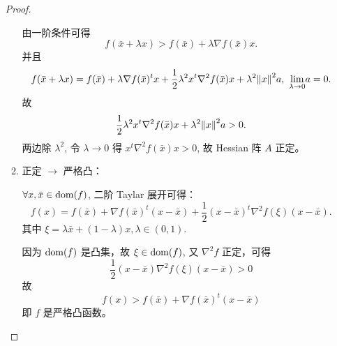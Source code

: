 \begin{Problem}
\begin{enumerate}
\begin{proof}
\begin{enumerate}
                由一阶条件可得 
                \[f(\bar{x} + \lambda x) > f(\bar{x}) + \lambda \nabla f(\bar{x})x.\] 
                并且
                \[f(\bar{x} + \lambda x) = f(\bar{x}) + \lambda \nabla f(\bar{x})^tx + \frac{1}{2}\lambda^2 x^t\nabla^2f(\bar{x})x + \lambda^2\norm{x}^2a,\ \underset{\lambda \to 0}{\lim} a = 0.\] 
                故 
                \[\frac{1}{2}\lambda^2 x^t\nabla^2f(\bar{x})x + \lambda^2\norm{x}^2a > 0.\] 
                两边除 $\lambda^2$, 令 $\lambda \to 0$ 得 $x^t\nabla^2f(\bar{x})x > 0$, 故 Hessian 阵 $A$ 正定。
                \item 正定 $\to$ 严格凸：
                
                $\forall x, \bar{x} \in \operatorname{dom}(f)$, 二阶 Taylar 展开可得：
                \[f(x) = f(\bar{x}) + \nabla f(\bar{x})^t(x - \bar{x}) + \frac{1}{2}(x - \bar{x})^t\nabla^2f(\xi)(x - \bar{x}).\]
                其中 $\xi = \lambda \bar{x} + (1 - \lambda)x, \lambda \in (0, 1).$

                因为 $\operatorname{dom}(f)$ 是凸集，故 $\xi \in \operatorname{dom}(f)$, 又 $\nabla^2f$ 正定，可得 
                \[\frac{1}{2}(x - \bar{x})\nabla^2f(\xi)(x - \bar{x}) > 0\]
                故 
                \[f(x) > f(\bar{x}) + \nabla f(\bar{x})^t(x - \bar{x})\]
                即 $f$ 是严格凸函数。
            \end{enumerate}
        \end{proof}
    \end{enumerate}
\end{Problem}


